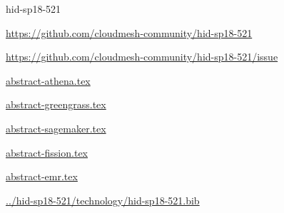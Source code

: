 \begin{IU}

hid-sp18-521

\url{https://github.com/cloudmesh-community/hid-sp18-521}

\url{https://github.com/cloudmesh-community/hid-sp18-521/issue}

\href{https://github.com/cloudmesh-community/hid-sp18-521/blob/master//technology/abstract-athena.tex}{abstract-athena.tex}

\href{https://github.com/cloudmesh-community/hid-sp18-521/blob/master//technology/abstract-greengrass.tex}{abstract-greengrass.tex}

\href{https://github.com/cloudmesh-community/hid-sp18-521/blob/master//technology/abstract-sagemaker.tex}{abstract-sagemaker.tex}

\href{https://github.com/cloudmesh-community/hid-sp18-521/blob/master//technology/abstract-fission.tex}{abstract-fission.tex}

\href{https://github.com/cloudmesh-community/hid-sp18-521/blob/master//technology/abstract-emr.tex}{abstract-emr.tex}

\href{https://github.com/cloudmesh-community/hid-sp18-521/blob/master//technology/hid-sp18-521.bib}{../hid-sp18-521/technology/hid-sp18-521.bib}

\end{IU}


